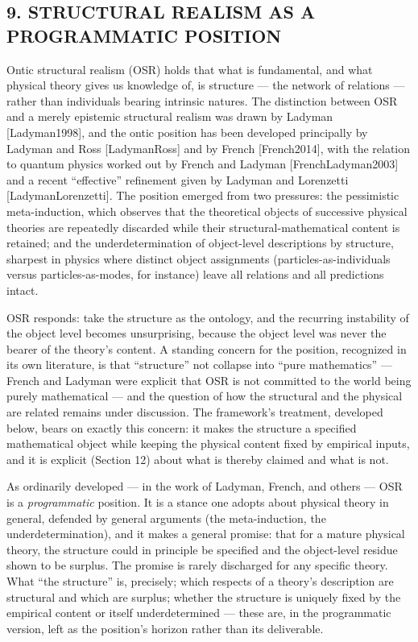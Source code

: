 \documentclass[
]{article}
\begin{document}
\hypertarget{structural-realism-as-a-programmatic-position}{%
\subsection{9. STRUCTURAL REALISM AS A PROGRAMMATIC
POSITION}\label{structural-realism-as-a-programmatic-position}}

Ontic structural realism (OSR) holds that what is fundamental, and what
physical theory gives us knowledge of, is structure --- the network of
relations --- rather than individuals bearing intrinsic natures. The
distinction between OSR and a merely epistemic structural realism was
drawn by Ladyman {[}Ladyman1998{]}, and the ontic position has been
developed principally by Ladyman and Ross {[}LadymanRoss{]} and by
French {[}French2014{]}, with the relation to quantum physics worked out
by French and Ladyman {[}FrenchLadyman2003{]} and a recent ``effective''
refinement given by Ladyman and Lorenzetti {[}LadymanLorenzetti{]}. The
position emerged from two pressures: the pessimistic meta-induction,
which observes that the theoretical objects of successive physical
theories are repeatedly discarded while their structural-mathematical
content is retained; and the underdetermination of object-level
descriptions by structure, sharpest in physics where distinct object
assignments (particles-as-individuals versus particles-as-modes, for
instance) leave all relations and all predictions intact.

OSR responds: take the structure as the ontology, and the recurring
instability of the object level becomes unsurprising, because the object
level was never the bearer of the theory's content. A standing concern
for the position, recognized in its own literature, is that
``structure'' not collapse into ``pure mathematics'' --- French and
Ladyman were explicit that OSR is not committed to the world being
purely mathematical --- and the question of how the structural and the
physical are related remains under discussion. The framework's
treatment, developed below, bears on exactly this concern: it makes the
structure a specified mathematical object while keeping the physical
content fixed by empirical inputs, and it is explicit (Section 12) about
what is thereby claimed and what is not.

As ordinarily developed --- in the work of Ladyman, French, and others
--- OSR is a \emph{programmatic} position. It is a stance one adopts
about physical theory in general, defended by general arguments (the
meta-induction, the underdetermination), and it makes a general promise:
that for a mature physical theory, the structure could in principle be
specified and the object-level residue shown to be surplus. The promise
is rarely discharged for any specific theory. What ``the structure'' is,
precisely; which respects of a theory's description are structural and
which are surplus; whether the structure is uniquely fixed by the
empirical content or itself underdetermined --- these are, in the
programmatic version, left as the position's horizon rather than its
deliverable.
\end{document}
